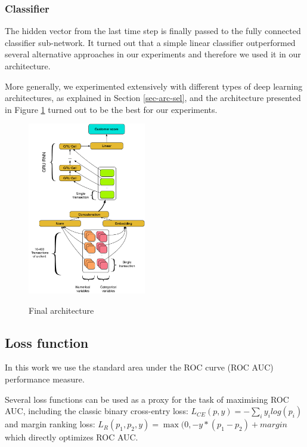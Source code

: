 \documentclass[sigconf]{acmart}
\begin{document}
\subsubsection{Classifier}

The hidden vector from the last time step is finally passed to the fully connected classifier sub-network.
It turned out that a simple linear classifier outperformed several alternative approaches in our experiments and therefore we used it in our architecture.

More generally, we experimented extensively with different types of deep learning architectures, as explained in Section \ref{sec-arc-sel}, and the architecture presented in Figure \ref{fig-arch} turned out to be the best for our experiments.


\begin{figure}[ht]
  \caption{Final architecture}
  \includegraphics[width=0.46\textwidth]{figures/architecture.pdf}
  \label{fig-arch}
\end{figure}

\subsection{Loss function}

In this work we use the standard area under the ROC curve (ROC AUC) performance measure.

Several loss functions can be used as a proxy for the task of maximising ROC AUC, including the classic binary cross-entry loss: $L_{CE}(p, y) = - \sum_i y_ilog(p_i)$ and margin ranking loss: $ L_R(p_1, p_2, y) = \max(0, -y * (p_1 - p_2) + margin $ which directly optimizes ROC AUC.
\end{document}
